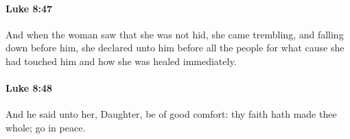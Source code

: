 		\paragraph{Luke 8:47} %
			\label{LUKE-8-47}

			And when the woman saw that she was not hid, she came trembling, and falling down before him, she declared unto him before all the people for what cause she had touched him and how she was healed immediately.

			\begin{framed}
			\scriptsize
				\begin{compactdesc}
					\item[SBLG] 
				\end{compactdesc}
			\end{framed}

		\paragraph{Luke 8:48} %
			\label{LUKE-8-48}

			And he said unto her, Daughter, be of good comfort: thy faith hath made thee whole; go in peace.

